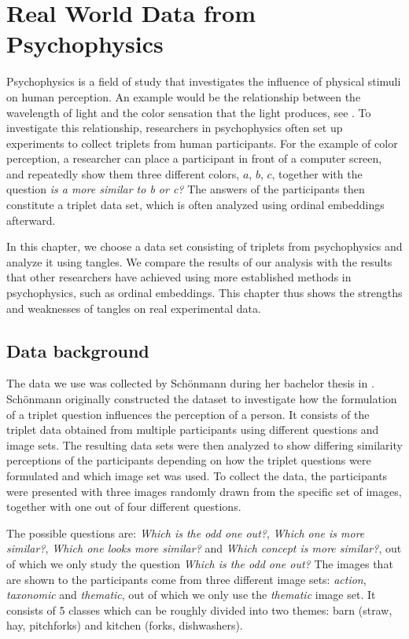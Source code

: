 \chapter{Real World Data from Psychophysics}\label{real}
Psychophysics is a field of study that investigates the influence of physical stimuli on human perception. An example would be the relationship between the wavelength of 
light and the color sensation that the light produces, see \cite{shepardAnalysisProximitiesMultidimensional1962}. To investigate this relationship, researchers in psychophysics
often set up experiments to collect triplets from human participants. For the example of color perception, a researcher can place a participant in front of a computer 
screen, and repeatedly show them three different colors, $a$, $b$, $c$, together with the question \textit{is a more similar to b or c?} 
The answers of the participants then constitute a triplet data set, which is often analyzed using ordinal embeddings afterward.

In this chapter, we choose a data set consisting of triplets from psychophysics and analyze it using tangles. 
We compare the results of our analysis with the results that other researchers have achieved using more established methods in psychophysics, such as ordinal embeddings.
This chapter thus shows the strengths and weaknesses of tangles on real experimental data.

\section{Data background}
The data we use was collected by Schönmann during her bachelor thesis in \cite{inesschonmannSimilarityJudgementsNatural2021}. Schönmann originally
constructed the dataset to investigate how the formulation of a triplet question influences 
the perception of a person. It consists of the triplet data obtained from multiple
participants using different questions and image sets.  The resulting data sets were then analyzed to show differing similarity perceptions of the
participants depending on how the triplet questions were formulated and which image set was used.
To collect the data, the participants were presented with three images randomly drawn from the specific set of images, together with one out of four different questions. 

The possible questions are: \textit{Which is the odd one out?}, \textit{Which one is more similar?},
\textit{Which one looks more similar?} and \textit{Which concept is more similar?}, out of which we only study the question \textit{Which is the odd one out?} 
The images that are shown to the participants come from three different image sets: \textit{action}, \textit{taxonomic} and \textit{thematic}, out of which we only use the \textit{thematic} image set.
It consists of 5 classes which can be roughly divided into two themes: barn (straw, hay, pitchforks) and kitchen (forks, dishwashers).

